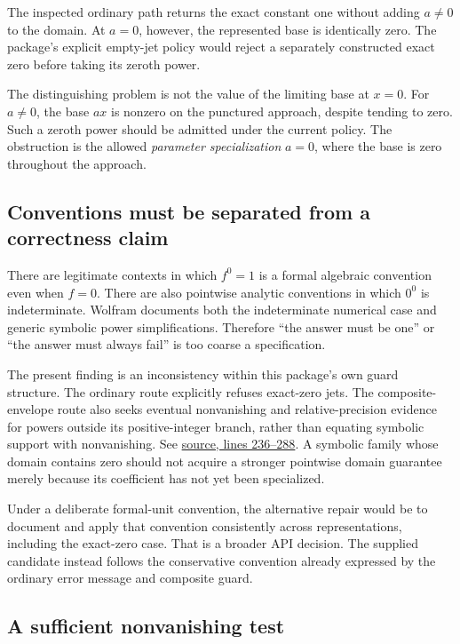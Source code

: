 \documentclass[11pt,letterpaper]{article}
\newcommand{\src}[3]{\href{https://github.com/VladimirReshetnikov/Asymptotic/blob/8e859961d7d37f008b826f3a8cad406460271614/#1\#L#2-L#3}{source, lines #2--#3}}
\begin{document}
The inspected ordinary path returns the exact constant one without adding $a\ne0$ to the domain. At $a=0$, however, the represented base is identically zero. The package's explicit empty-jet policy would reject a separately constructed exact zero before taking its zeroth power.

The distinguishing problem is not the value of the limiting base at $x=0$. For $a\ne0$, the base $a x$ is nonzero on the punctured approach, despite tending to zero. Such a zeroth power should be admitted under the current policy. The obstruction is the allowed \emph{parameter specialization} $a=0$, where the base is zero throughout the approach.

\subsection{Conventions must be separated from a correctness claim}

There are legitimate contexts in which $f^0=1$ is a formal algebraic convention even when $f=0$. There are also pointwise analytic conventions in which $0^0$ is indeterminate. Wolfram documents both the indeterminate numerical case and generic symbolic power simplifications.\cite{powerdoc} Therefore ``the answer must be one'' or ``the answer must always fail'' is too coarse a specification.

The present finding is an inconsistency within this package's own guard structure. The ordinary route explicitly refuses exact-zero jets. The composite-envelope route also seeks eventual nonvanishing and relative-precision evidence for powers outside its positive-integer branch, rather than equating symbolic support with nonvanishing.\cite{envelope} See \src{src/Kernel/SeriesEnvelopeArithmetic.wl}{236}{288}. A symbolic family whose domain contains zero should not acquire a stronger pointwise domain guarantee merely because its coefficient has not yet been specialized.

Under a deliberate formal-unit convention, the alternative repair would be to document and apply that convention consistently across representations, including the exact-zero case. That is a broader API decision. The supplied candidate instead follows the conservative convention already expressed by the ordinary error message and composite guard.

\subsection{A sufficient nonvanishing test}
\end{document}
